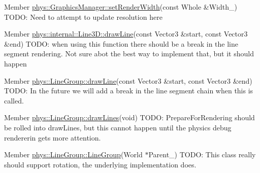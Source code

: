 \label{dd/da0/todo__todo000012}
\hypertarget{dd/da0/todo__todo000012}{}
 
\begin{DoxyDescription}
\item[Member \hyperlink{classphys_1_1GraphicsManager_aea5fb5808a23fa29c8522c396ac0d6b5}{phys::GraphicsManager::setRenderWidth}(const Whole \&Width\_\-) ]TODO: Need to attempt to update resolution here 
\end{DoxyDescription}

\label{dd/da0/todo__todo000014}
\hypertarget{dd/da0/todo__todo000014}{}
 
\begin{DoxyDescription}
\item[Member \hyperlink{classphys_1_1internal_1_1Line3D_a31bf19dc06547cbe042e1ddfbcf672f3}{phys::internal::Line3D::drawLine}(const Vector3 \&start, const Vector3 \&end) ]TODO: when using this function there should be a break in the line segment rendering. Not sure abot the best way to implement that, but it should happen 
\end{DoxyDescription}

\label{dd/da0/todo__todo000016}
\hypertarget{dd/da0/todo__todo000016}{}
 
\begin{DoxyDescription}
\item[Member \hyperlink{classphys_1_1LineGroup_a141db62ea17d94b9bce421e5df5a8d89}{phys::LineGroup::drawLine}(const Vector3 \&start, const Vector3 \&end) ]TODO: In the future we will add a break in the line segment chain when this is called. 
\end{DoxyDescription}

\label{dd/da0/todo__todo000017}
\hypertarget{dd/da0/todo__todo000017}{}
 
\begin{DoxyDescription}
\item[Member \hyperlink{classphys_1_1LineGroup_ade1bb4f8e1164e1b8d7aeabbc970b79d}{phys::LineGroup::drawLines}(void) ]TODO: PrepareForRendering should be rolled into drawLines, but this cannot happen until the physics debug rendererin gets more attention. 
\end{DoxyDescription}

\label{dd/da0/todo__todo000015}
\hypertarget{dd/da0/todo__todo000015}{}
 
\begin{DoxyDescription}
\item[Member \hyperlink{classphys_1_1LineGroup_a676039a6beec56d24c631e9da5fd7e76}{phys::LineGroup::LineGroup}(World $\ast$Parent\_\-) ]TODO: This class really should support rotation, the underlying implementation does. 
\end{DoxyDescription}

